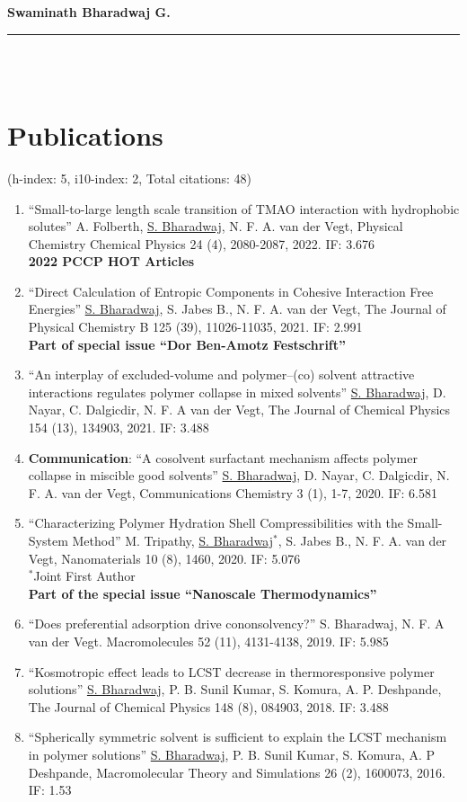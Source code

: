 \documentclass[a4paper,14pt]{article}
\begin{document}
\noindent\textbf{\Large Swaminath Bharadwaj G.}\\
\rule{\textwidth}{1pt}\\\ \\
 \section*{\large Publications}
(h-index: 5, i10-index: 2, Total citations: 48)
\begin{enumerate}
\item
\enquote{Small-to-large length scale transition of TMAO interaction with hydrophobic solutes}
A. Folberth, \underline{S. Bharadwaj}, N. F. A. van der Vegt,
Physical Chemistry Chemical Physics 24 (4), 2080-2087, 2022. {\color{red} IF: 3.676} \\ 
\textbf{2022 PCCP HOT Articles}
\item
\enquote{Direct Calculation of Entropic Components in Cohesive Interaction Free Energies}
\underline{S. Bharadwaj}, S. Jabes B., N. F. A.  van der Vegt,
The Journal of Physical Chemistry B 125 (39), 11026-11035, 2021. {\color{red} IF: 2.991}\\
\textbf{Part of special issue \enquote{Dor Ben-Amotz Festschrift}}
\item
\enquote{An interplay of excluded-volume and polymer–(co) solvent attractive interactions regulates polymer collapse in mixed solvents}
\underline{S. Bharadwaj}, D. Nayar, C. Dalgicdir, N. F. A van der Vegt,
The Journal of Chemical Physics 154 (13), 134903, 2021. {\color{red}IF: 3.488}
\item
\textbf{Communication}: \enquote{A cosolvent surfactant mechanism affects polymer collapse in miscible good solvents}
\underline{S. Bharadwaj}, D. Nayar, C. Dalgicdir, N. F. A. van der Vegt,
Communications Chemistry 3 (1), 1-7, 2020. {\color{red}IF: 6.581}
\item
\enquote{Characterizing Polymer Hydration Shell Compressibilities with the Small-System Method}
M. Tripathy, \underline{S. Bharadwaj}$^{\ast}$, S. Jabes B., N. F. A. van der Vegt,
Nanomaterials 10 (8), 1460, 2020. IF: {\color{red}5.076} \\
$^{\ast}$Joint First Author\\
\textbf{Part of the special issue \enquote{Nanoscale Thermodynamics}}
\item
\enquote{Does preferential adsorption drive cononsolvency?}
S. Bharadwaj, N. F. A van der Vegt.
Macromolecules 52 (11), 4131-4138, 2019. {\color{red}IF: 5.985}
\item
\enquote{Kosmotropic effect leads to LCST decrease in thermoresponsive polymer solutions}
\underline{S. Bharadwaj}, P. B. Sunil Kumar, S. Komura, A. P. Deshpande,
The Journal of Chemical Physics 148 (8), 084903, 2018. {\color{red}IF: 3.488}
\item
\enquote{Spherically symmetric solvent is sufficient to explain the LCST mechanism in polymer solutions}
\underline{S. Bharadwaj}, P. B. Sunil Kumar, S. Komura, A. P Deshpande, Macromolecular Theory and Simulations 26 (2), 1600073, 2016. {\color{red} IF: 1.53}
\end{enumerate}
\end{document}

